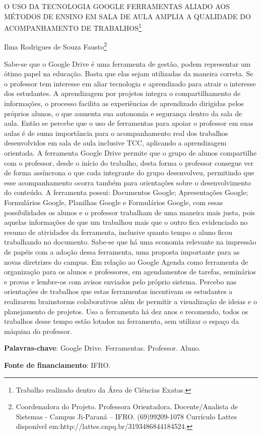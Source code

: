 \documentclass[article,12pt,onesidea,4paper,english,brazil]{abntex2}
\begin{document}
	
	
	\frenchspacing 
	
	\begin{center}
		\LARGE O USO DA TECNOLOGIA GOOGLE FERRAMENTAS ALIADO AOS MÉTODOS DE ENSINO EM SALA DE AULA AMPLIA A QUALIDADE DO ACOMPANHAMENTO DE TRABALHOS\footnote{Trabalho realizado dentro da Área de Ciências Exatas.}
		
		\normalsize
	Ilma Rodrigues de Souza Fausto\footnote{Coordenadora do Projeto. Professora Orientadora. Docente/Analista de Sistemas - Campus Ji-Paraná – IFRO. (69)99209-1078 Currículo Lattes disponível em:http://lattes.cnpq.br/3193486844184524.} 
	\end{center}
	
	\noindent Sabe-se que o Google Drive é uma ferramenta de gestão, podem representar um ótimo papel na
	educação. Basta que elas sejam utilizadas da maneira correta. Se o professor tem interesse em aliar
	tecnologia e aprendizado para atrair o interesse dos estudantes. A aprendizagem por projetos integra o
	compartilhamento de informações, o processo facilita as experiências de aprendizado dirigidas pelos
	próprios alunos, o que aumenta sua autonomia e segurança dentro da sala de aula. Então se percebe
	que o uso de ferramentas para apoiar o professor em suas aulas é de suma importância para o
	acompanhamento real dos trabalhos desenvolvidos em sala de aula inclusive TCC, aplicando a
	aprendizagem orientada. A ferramenta Google Drive permite que o grupo de alunos compartilhe com
	o professor, desde o início do trabalho, desta forma o professor consegue ver de forma assíncrona o
	que cada integrante do grupo desenvolveu, permitindo que esse acompanhamento ocorra também para
	orientações sobre o desenvolvimento do conteúdo. A ferramenta possui: Documentos Google;
	Apresentações Google; Formulários Google, Planilhas Google e Formulários Google, com essas
	possibilidades os alunos e o professor trabalham de uma maneira mais justa, pois aquelas informações
	de que um trabalhou mais que o outro fica evidenciado no resumo de atividades da ferramenta,
	inclusive quanto tempo o aluno ficou trabalhando no documento. Sabe-se que há uma economia
	relevante na impressão de papéis com a adoção dessa ferramenta, uma proposta importante para as
	novas diretrizes do campus. Em relação ao Google Agenda como ferramenta de organização para os
	alunos e professores, em agendamentos de tarefas, seminários e provas e lembre-os com avisos
	enviados pelo próprio sistema. Percebo nas orientações de trabalhos que estas ferramentas incentivam
	os estudantes a realizarem brainstorms colaborativos além de permitir a visualização de ideias e o
	planejamento de projetos. Uso a ferramenta há dez anos e recomendo, todos os trabalhos desse tempo
	estão lotados na ferramenta, sem utilizar o espaço da máquina do professor.
	
	\vspace{\onelineskip}
	
	\noindent
	\textbf{Palavras-chave}: Google Drive. Ferramentas. Professor. Aluno.
	
	\noindent
	\textbf{Fonte de financiamento}: IFRO.
\end{document}
